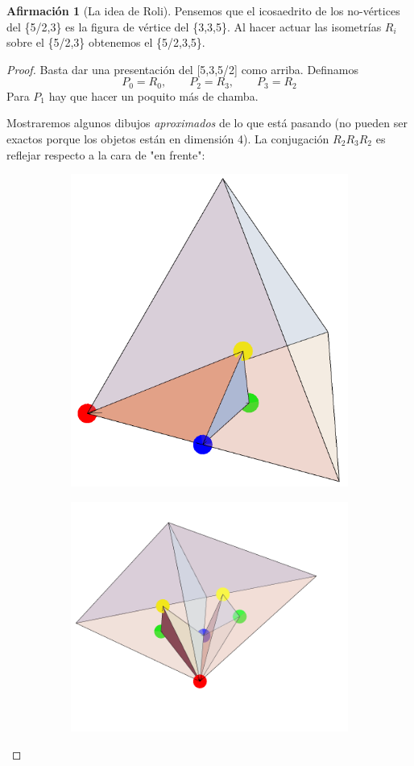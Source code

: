 \documentclass[spanish]{article}
\theoremstyle{definition}
\newtheorem*{af}{Afirmación}
\begin{document}
	\begin{af}[La idea de Roli] Pensemos que el icosaedrito de los no-vértices del \{5/2,3\} es la figura de vértice del \{3,3,5\}. Al hacer actuar las isometrías $R_i$ sobre el \{5/2,3\} obtenemos el \{5/2,3,5\}.
	\end{af}
	\begin{proof}
		Basta dar una presentación del [5,3,5/2] como arriba. Definamos 
		\[P_0=R_0,\qquad P_2=R_3,\qquad P_3=R_2\]
		Para $P_1$ hay que hacer un poquito más de chamba.
		
		Mostraremos algunos dibujos \textit{aproximados} de lo que está pasando (no pueden ser exactos porque los objetos están en dimensión 4). La conjugación $R_2R_3R_2$ es reflejar respecto a la cara de "en frente":
		\begin{figure}[H]
			\begin{subfigure}{0.4\linewidth}
				\centering
				\includegraphics[width=0.6\linewidth]{p5}
			\end{subfigure}
			\begin{subfigure}{0.5\linewidth}
				\centering
				\includegraphics[width=0.9\linewidth]{p6}

\end{subfigure}
\end{figure}
\end{proof}
\end{document}
